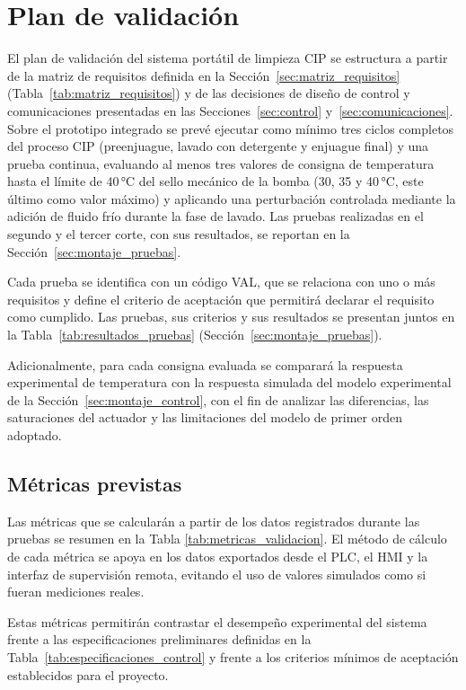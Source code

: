 \section{Plan de validación}\label{sec:plan_validacion}

El plan de validación del sistema portátil de limpieza CIP se estructura a partir de la matriz de
requisitos definida en la Sección~\ref{sec:matriz_requisitos} (Tabla~\ref{tab:matriz_requisitos}) y de las decisiones de diseño de control y
comunicaciones presentadas en las Secciones~\ref{sec:control} y~\ref{sec:comunicaciones}. Sobre el prototipo integrado se prevé ejecutar como mínimo tres
ciclos completos del proceso CIP (preenjuague, lavado con detergente y enjuague final) y una prueba continua,
evaluando al menos tres valores de consigna de temperatura hasta el límite de 40\,°C del sello mecánico de la bomba
(30, 35 y 40\,°C, este último como valor máximo) y aplicando una perturbación controlada mediante la adición de fluido frío
durante la fase de lavado. Las pruebas realizadas en el segundo y el tercer corte, con sus resultados, se reportan en la Sección~\ref{sec:montaje_pruebas}.

Cada prueba se identifica con un código VAL, que se relaciona con uno o más requisitos y define el criterio de aceptación que permitirá declarar el requisito como cumplido. Las pruebas, sus criterios y sus resultados se presentan juntos en la Tabla~\ref{tab:resultados_pruebas} (Sección~\ref{sec:montaje_pruebas}).


Adicionalmente, para cada consigna evaluada se comparará la respuesta experimental de temperatura con
la respuesta simulada del modelo experimental de la Sección~\ref{sec:montaje_control}, con el fin de analizar las diferencias,
las saturaciones del actuador y las limitaciones del modelo de primer orden adoptado.

\subsection{Métricas previstas}

Las métricas que se calcularán a partir de los datos registrados durante las pruebas se
resumen en la Tabla \ref{tab:metricas_validacion}. El método de cálculo de cada métrica se apoya en los datos exportados desde el
PLC, el HMI y la interfaz de supervisión remota, evitando el uso de valores simulados como si fueran
mediciones reales.



Estas métricas permitirán contrastar el desempeño experimental del sistema frente a las
especificaciones preliminares definidas en la Tabla~\ref{tab:especificaciones_control} y frente a los criterios mínimos de aceptación
establecidos para el proyecto.
